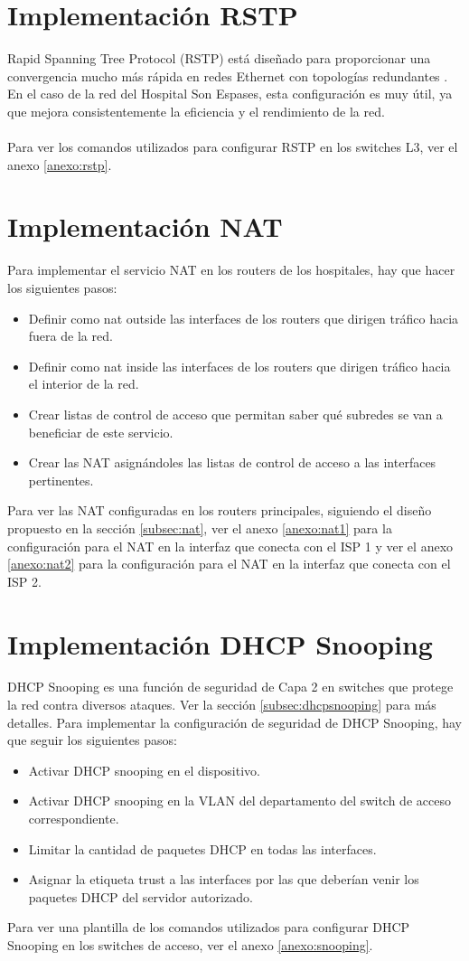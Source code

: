 \section{Implementación RSTP}
Rapid Spanning Tree Protocol (RSTP) está diseñado para proporcionar una convergencia mucho más rápida en redes Ethernet con topologías redundantes \cite{cisco_rstp_8021w}. En el caso de la red del Hospital Son Espases, esta configuración es muy útil, ya que mejora consistentemente la eficiencia y el rendimiento de la red.
\\ \\
Para ver los comandos utilizados para configurar RSTP en los switches L3, ver el anexo \ref{anexo:rstp}.

\section{Implementación NAT}
Para implementar el servicio NAT en los routers de los hospitales, hay que hacer los siguientes pasos:
\begin{itemize}
    \item Definir como nat outside las interfaces de los routers que dirigen tráfico hacia fuera de la red.
    \item Definir como nat inside las interfaces de los routers que dirigen tráfico hacia el interior de la red.
    \item Crear listas de control de acceso que permitan saber qué subredes se van a beneficiar de este servicio.
    \item Crear las NAT asignándoles las listas de control de acceso a las interfaces pertinentes.
\end{itemize}
Para ver las NAT configuradas en los routers principales, siguiendo el diseño propuesto en la sección \ref{subsec:nat}, ver el anexo \ref{anexo:nat1} para la configuración para el NAT en 
la interfaz que conecta con el ISP 1 y ver el anexo \ref{anexo:nat2} para la configuración para el NAT en la interfaz que conecta con el ISP 2.

\section{Implementación DHCP Snooping}
DHCP Snooping es una función de seguridad de Capa 2 en switches que protege la red contra diversos ataques. Ver la sección \ref{subsec:dhcpsnooping} para más detalles. Para implementar la configuración de seguridad de DHCP Snooping, hay que seguir los siguientes pasos:
\begin{itemize}
    \item Activar DHCP snooping en el dispositivo.
    \item Activar DHCP snooping en la VLAN del departamento del switch de acceso correspondiente.
    \item Limitar la cantidad de paquetes DHCP en todas las interfaces.
    \item Asignar la etiqueta trust a las interfaces por las que deberían venir los paquetes DHCP del servidor autorizado.
\end{itemize}
Para ver una plantilla de los comandos utilizados para configurar DHCP Snooping en los switches de acceso, ver el anexo \ref{anexo:snooping}.

